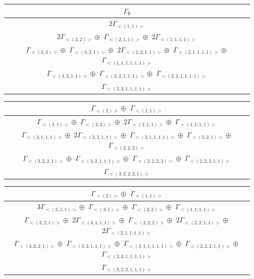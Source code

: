 \bigskip
\begin{minipage}{1\textwidth}
\centering
\begin{tabular}{|c|}\hline
$\Gamma_\emptyset$
\\ \hline
$ 2 \Gamma_{<(
1 , 
1
)>}$
\\ \hline
$ 2 \Gamma_{<(
2 , 
2
)>} \oplus$
$\Gamma_{<(
2 , 
1 , 
1
)>} \oplus$
$ 2 \Gamma_{<(
1 , 
1 , 
1 , 
1
)>}$
\\ \hline
$\Gamma_{<(
3 , 
3
)>} \oplus$
$\Gamma_{<(
3 , 
2 , 
1
)>} \oplus$
$ 2 \Gamma_{<(
2 , 
2 , 
1 , 
1
)>} \oplus$
$\Gamma_{<(
2 , 
1 , 
1 , 
1 , 
1
)>} \oplus$
$\Gamma_{<(
1 , 
1 , 
1 , 
1 , 
1 , 
1
)>}$
\\ \hline
$\Gamma_{<(
3 , 
3 , 
1 , 
1
)>} \oplus$
$\Gamma_{<(
3 , 
2 , 
1 , 
1 , 
1
)>} \oplus$
$\Gamma_{<(
2 , 
2 , 
1 , 
1 , 
1 , 
1
)>}$
\\ \hline
$\Gamma_{<(
3 , 
3 , 
1 , 
1 , 
1 , 
1
)>}$
\\
\hline\end{tabular}\end{minipage}
\bigskip
\begin{minipage}{1\textwidth}
\centering
\begin{tabular}{|c|}\hline
$\Gamma_{<(
2
)>} \oplus$
$\Gamma_{<(
1 , 
1
)>}$
\\ \hline
$\Gamma_{<(
3 , 
1
)>} \oplus$
$\Gamma_{<(
2 , 
2
)>} \oplus$
$ 2 \Gamma_{<(
2 , 
1 , 
1
)>} \oplus$
$\Gamma_{<(
1 , 
1 , 
1 , 
1
)>}$
\\ \hline
$\Gamma_{<(
3 , 
1 , 
1 , 
1
)>} \oplus$
$ 2 \Gamma_{<(
2 , 
2 , 
1 , 
1
)>} \oplus$
$\Gamma_{<(
2 , 
1 , 
1 , 
1 , 
1
)>} \oplus$
$\Gamma_{<(
3 , 
2 , 
1
)>} \oplus$
$\Gamma_{<(
2 , 
2 , 
2
)>}$
\\ \hline
$\Gamma_{<(
3 , 
2 , 
2 , 
1
)>} \oplus$
$\Gamma_{<(
3 , 
2 , 
1 , 
1 , 
1
)>} \oplus$
$\Gamma_{<(
2 , 
2 , 
2 , 
2
)>} \oplus$
$\Gamma_{<(
2 , 
2 , 
2 , 
1 , 
1
)>}$
\\ \hline
$\Gamma_{<(
3 , 
2 , 
2 , 
2 , 
1
)>}$
\\
\hline\end{tabular}\end{minipage}
\bigskip
\begin{minipage}{1\textwidth}
\centering
\begin{tabular}{|c|}\hline
$\Gamma_{<(
2
)>} \oplus$
$\Gamma_{<(
1 , 
1
)>}$
\\ \hline
$ 3 \Gamma_{<(
2 , 
1 , 
1
)>} \oplus$
$\Gamma_{<(
3 , 
1
)>} \oplus$
$\Gamma_{<(
2 , 
2
)>} \oplus$
$\Gamma_{<(
1 , 
1 , 
1 , 
1
)>}$
\\ \hline
$\Gamma_{<(
3 , 
2 , 
1
)>} \oplus$
$ 2 \Gamma_{<(
3 , 
1 , 
1 , 
1
)>} \oplus$
$\Gamma_{<(
2 , 
2 , 
2
)>} \oplus$
$ 2 \Gamma_{<(
2 , 
2 , 
1 , 
1
)>} \oplus$
$ 2 \Gamma_{<(
2 , 
1 , 
1 , 
1 , 
1
)>}$
\\ \hline
$\Gamma_{<(
3 , 
2 , 
2 , 
1
)>} \oplus$
$\Gamma_{<(
3 , 
2 , 
1 , 
1 , 
1
)>} \oplus$
$\Gamma_{<(
3 , 
1 , 
1 , 
1 , 
1 , 
1
)>} \oplus$
$\Gamma_{<(
2 , 
2 , 
2 , 
1 , 
1
)>} \oplus$
$\Gamma_{<(
2 , 
2 , 
1 , 
1 , 
1 , 
1
)>}$
\\ \hline
$\Gamma_{<(
3 , 
2 , 
2 , 
1 , 
1 , 
1
)>}$
\\
\hline\end{tabular}\end{minipage}
